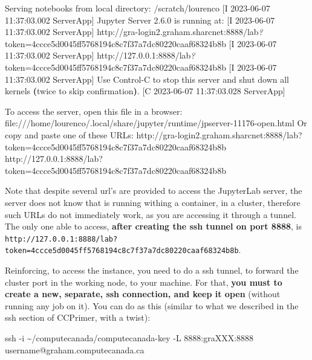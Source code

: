 \documentclass[
]{book}
\newenvironment{Shaded}{\begin{snugshade}}{\end{snugshade}}
\newcommand{\AttributeTok}[1]{\textcolor[rgb]{0.77,0.63,0.00}{#1}}
\newcommand{\BuiltInTok}[1]{#1}
\newcommand{\ErrorTok}[1]{\textcolor[rgb]{0.64,0.00,0.00}{\textbf{#1}}}
\newcommand{\ExtensionTok}[1]{#1}
\newcommand{\FunctionTok}[1]{\textcolor[rgb]{0.00,0.00,0.00}{#1}}
\newcommand{\KeywordTok}[1]{\textcolor[rgb]{0.13,0.29,0.53}{\textbf{#1}}}
\newcommand{\NormalTok}[1]{#1}
\newcommand{\PreprocessorTok}[1]{\textcolor[rgb]{0.56,0.35,0.01}{\textit{#1}}}
\begin{document}
\begin{Shaded}
\begin{Highlighting}[]
\ExtensionTok{[I}\NormalTok{ 2023{-}06{-}07 11:37:03.002 ServerApp] Serving notebooks from local directory: /scratch/lourenco}
\ExtensionTok{[I}\NormalTok{ 2023{-}06{-}07 11:37:03.002 ServerApp] Jupyter Server 2.6.0 is running at:}
\ExtensionTok{[I}\NormalTok{ 2023{-}06{-}07 11:37:03.002 ServerApp] http://gra{-}login2.graham.sharcnet:8888/lab}\PreprocessorTok{?}\NormalTok{token=4ccce5d0045ff5768194c8c7f37a7dc80220caaf68324b8b}
\ExtensionTok{[I}\NormalTok{ 2023{-}06{-}07 11:37:03.002 ServerApp]     http://127.0.0.1:8888/lab}\PreprocessorTok{?}\NormalTok{token=4ccce5d0045ff5768194c8c7f37a7dc80220caaf68324b8b}
\ExtensionTok{[I}\NormalTok{ 2023{-}06{-}07 11:37:03.002 ServerApp] Use Control{-}C to stop this server and shut down all kernels }\ErrorTok{(}\ExtensionTok{twice}\NormalTok{ to skip confirmation}\KeywordTok{)}\BuiltInTok{.}
\ExtensionTok{[C}\NormalTok{ 2023{-}06{-}07 11:37:03.028 ServerApp] }
    
    \ExtensionTok{To}\NormalTok{ access the server, open this file in a browser:}
        \ExtensionTok{file:///home/lourenco/.local/share/jupyter/runtime/jpserver{-}11176{-}open.html}
    \ExtensionTok{Or}\NormalTok{ copy and paste one of these URLs:}
        \ExtensionTok{http://gra{-}login2.graham.sharcnet:8888/lab?token=4ccce5d0045ff5768194c8c7f37a7dc80220caaf68324b8b}
        \ExtensionTok{http://127.0.0.1:8888/lab?token=4ccce5d0045ff5768194c8c7f37a7dc80220caaf68324b8b}
\end{Highlighting}
\end{Shaded}

Note that despite several url's are provided to access the JupyterLab server, the server does not know that is running withing a container, in a cluster, therefore such URLs do not immediately work, as you are accessing it through a tunnel. The only one able to access, \textbf{after creating the ssh tunnel on port 8888}, is \texttt{http://127.0.0.1:8888/lab?token=4ccce5d0045ff5768194c8c7f37a7dc80220caaf68324b8b}.

Reinforcing, to access the instance, you need
to do a ssh tunnel, to forward the cluster port in the working node, to your machine. For that, \textbf{you must to create a new, separate, ssh connection, and keep it open} (without
running any job on it). You can do as this (similar to what we described in the ssh section of CCPrimer, with a twist):

\begin{Shaded}
\begin{Highlighting}[]
\FunctionTok{ssh} \AttributeTok{{-}i}\NormalTok{ \textasciitilde{}/computecanada/computecanada{-}key }\AttributeTok{{-}L}\NormalTok{ 8888:graXXX:8888 username@graham.computecanada.ca}
\end{Highlighting}
\end{Shaded}
\end{document}
